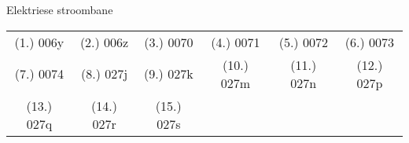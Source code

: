 \begin{eocexercises}{Elektriese stroombane}
\begin{enumerate}[noitemsep, label=\textbf{\arabic*}. ]
\end{enumerate}
\par \practiceinfo
 \par \begin{tabular}[h]{cccccc}
 (1.) 006y  &  (2.) 006z  &  (3.) 0070  &  (4.) 0071  &  (5.) 0072  &  (6.) 0073 \\
 (7.) 0074  &  (8.) 027j   &  (9.) 027k   &  (10.) 027m  &  (11.) 027n  &  (12.) 027p \\
 (13.) 027q  & (14.) 027r   &  (15.) 027s \end{tabular}
\end{eocexercises}

